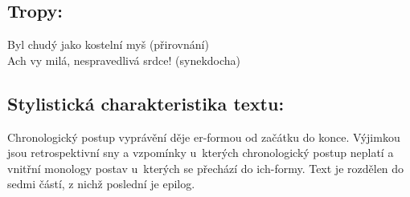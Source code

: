 \documentclass[A4paper]{extarticle} %
\begin{document}
\subsection*{Tropy:}
\noindent 
Byl chudý jako kostelní myš (přirovnání) \\
Ach vy milá, nespravedlivá srdce! (synekdocha)

\subsection*{Stylistická charakteristika textu:}
\noindent 
Chronologický postup vyprávění děje er-formou od začátku do konce. Výjimkou jsou retrospektivní sny a vzpomínky u~kterých chronologický postup neplatí a vnitřní monology postav u~kterých se přechází do ich-formy. Text je rozdělen do sedmi částí, z nichž poslední je epilog.
\end{document}
